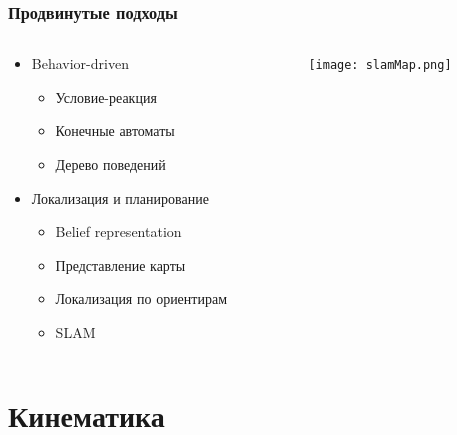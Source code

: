 \documentclass{../../slides-style}
\begin{document}
    \begin{frame}
        \frametitle{Продвинутые подходы}
        \begin{columns}
            \begin{column}{0.5\textwidth}
                \begin{itemize}
                    \item Behavior-driven
                    \begin{itemize}
                        \item Условие-реакция
                        \item Конечные автоматы
                        \item Дерево поведений
                    \end{itemize}
                    \item Локализация и планирование
                    \begin{itemize}
                        \item Belief representation
                        \item Представление карты
                        \item Локализация по ориентирам
                        \item SLAM
                    \end{itemize}
                \end{itemize}
            \end{column}
            \begin{column}{0.5\textwidth}
                \begin{center}
                    \texttt{[image: slamMap.png]}
                \end{center}
            \end{column}
        \end{columns}
    \end{frame}

    \section{Кинематика}
\end{document}
